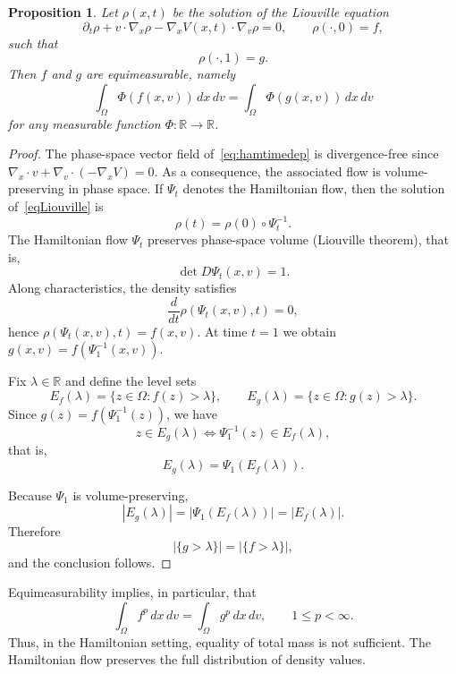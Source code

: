 \documentclass[11pt]{article}
\newtheorem{proposition}{Proposition}[section]
\newcommand{\R}{{\mathbb R}}
\begin{document}
\begin{proposition}
\label{prop:equimeasurable}
Let $\rho(x,t)$ be the solution 
of the Liouville equation
\[
\partial_t\rho + v\cdot\nabla_x\rho - \nabla_x V(x,t)\cdot\nabla_v\rho = 0,
\qquad
\rho(\cdot,0)=f,
\]
such that 
\[
\rho(\cdot,1)=g .
\]
Then $f$ and $g$ are equimeasurable, namely
\[
        \int_{\Omega} \Phi(f(x,v))\,dx\,dv
        =
        \int_{\Omega} \Phi(g(x,v))\,dx\,dv
\]
for any measurable function $\Phi:\R \to \R$.
\end{proposition}

\begin{proof}
The phase-space vector field of~\eqref{eq:hamtimedep} is divergence-free 
since $\nabla_x\cdot v+\nabla_v\cdot(-\nabla_x V)=0$.
As a consequence, the associated flow is volume-preserving in phase space.
If \(\Psi_t\) denotes the Hamiltonian flow, then the solution of~\eqref{eqLiouville} is
\[
        \rho(t)=\rho(0)\circ \Psi_t^{-1}.
\]
The Hamiltonian flow $\Psi_t$ preserves phase-space volume
(Liouville theorem), that is,
\[
\det D\Psi_t(x,v)=1 .
\]
Along characteristics, the density satisfies
\[
\frac{d}{dt}\rho(\Psi_t(x,v),t)=0,
\]
hence $\rho(\Psi_t(x,v),t)=f(x,v)$. At time $t=1$ we obtain $g(x,v)=f(\Psi_1^{-1}(x,v))$. 

Fix $\lambda\in\R$ and define the level sets
\[
E_f(\lambda)
=
\{z\in\Omega:f(z)>\lambda\},
\qquad
E_g(\lambda)
=
\{z\in\Omega:g(z)>\lambda\}.
\]
Since $g(z)=f(\Psi_1^{-1}(z))$, we have
\[
z\in E_g(\lambda)
\iff
\Psi_1^{-1}(z)\in E_f(\lambda),
\]
that is,
\[
E_g(\lambda)=\Psi_1(E_f(\lambda)).
\]

Because $\Psi_1$ is volume-preserving,
\[
|E_g(\lambda)|
=
|\Psi_1(E_f(\lambda))|
=
|E_f(\lambda)|.
\]
Therefore
\[
|\{g>\lambda\}|
=
|\{f>\lambda\}|,
\]
and the conclusion follows.
\end{proof}


    Equimeasurability implies, in particular, that
\[
        \int_{\Omega} f^p\,dx\,dv
        =
        \int_{\Omega} g^p\,dx\,dv,
        \qquad 1\le p<\infty .
\]
Thus, in the Hamiltonian setting, equality of total mass is not
sufficient. The Hamiltonian flow preserves the full distribution of density
values. 
\end{document}
